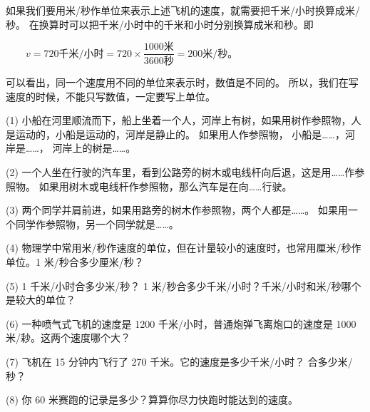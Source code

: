如果我们要用米/秒作单位来表示上述飞机的速度，就需要把千米/小时换算成米/秒。
在换算时可以把千米/小时中的千米和小时分别换算成米和秒。即

$\qquad v = 720\text{千米/小时} = 720 \times \dfrac{1000\text{米}}{3600\text{秒}} = 200 \text{米/秒。}$

可以看出，同一个速度用不同的单位来表示时，数值是不同的。
所以，我们在写速度的时候，不能只写数值，一定要写上单位。

\lianxi

(1) 小船在河里顺流而下，船上坐着一个人，河岸上有树，如果用树作参照物，人是运动的，小船是运动的，河岸是静止的。
如果用人作参照物， 小船是……，河岸是……， 河岸上的树是……。

(2) 一个人坐在行驶的汽车里，看到公路旁的树木或电线杆向后退，这是用……作参照物。
如果用树木或电线杆作参照物，那么汽车是在向……行驶。

(3) 两个同学并肩前进，如果用路旁的树木作参照物，两个人都是……。
如果用一个同学作参照物，另一个同学就是……。

(4) 物理学中常用米/秒作速度的单位，但在计量较小的速度时，也常用厘米/秒作单位。1 米/秒合多少厘米/秒？

(5) 1 千米/小时合多少米/秒？ 1 米/秒合多少千米/小时？千米/小时和米/秒哪个是较大的单位？

(6) 一种喷气式飞机的速度是 1200 千米/小时，普通炮弹飞离炮口的速度是 1000 米/耖。这两个速度哪个大？

(7) 飞机在 15 分钟内飞行了 270 千米。它的速度是多少千米/小时？ 合多少米/秒？

(8) 你 60 米赛跑的记录是多少？算算你尽力快跑时能达到的速度。

